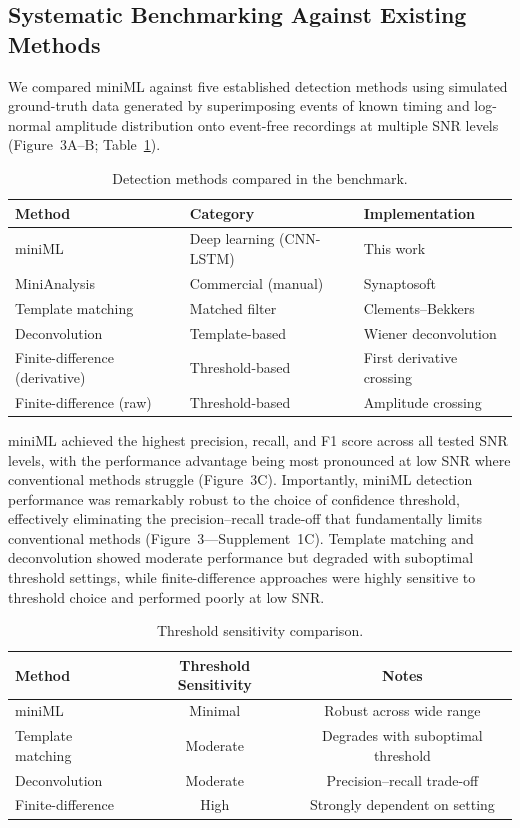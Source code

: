 \documentclass[11pt]{article}
\begin{document}
\subsection{Systematic Benchmarking Against Existing Methods}

We compared miniML against five established detection methods using simulated ground-truth data generated by superimposing events of known timing and log-normal amplitude distribution onto event-free recordings at multiple SNR levels (Figure~3A--B; Table~\ref{tab:methods}).

\begin{table}[H]
\centering
\caption{Detection methods compared in the benchmark.}
\label{tab:methods}
\begin{tabular}{lll}
\toprule
Method & Category & Implementation \\
\midrule
miniML & Deep learning (CNN-LSTM) & This work \\
MiniAnalysis & Commercial (manual) & Synaptosoft \\
Template matching & Matched filter & Clements--Bekkers \\
Deconvolution & Template-based & Wiener deconvolution \\
Finite-difference (derivative) & Threshold-based & First derivative crossing \\
Finite-difference (raw) & Threshold-based & Amplitude crossing \\
\bottomrule
\end{tabular}
\end{table}

miniML achieved the highest precision, recall, and F1 score across all tested SNR levels, with the performance advantage being most pronounced at low SNR where conventional methods struggle (Figure~3C). Importantly, miniML detection performance was remarkably robust to the choice of confidence threshold, effectively eliminating the precision--recall trade-off that fundamentally limits conventional methods (Figure~3---Supplement~1C). Template matching and deconvolution showed moderate performance but degraded with suboptimal threshold settings, while finite-difference approaches were highly sensitive to threshold choice and performed poorly at low SNR.

\begin{table}[H]
\centering
\caption{Threshold sensitivity comparison.}
\label{tab:threshold}
\begin{tabular}{lcc}
\toprule
Method & Threshold Sensitivity & Notes \\
\midrule
miniML & Minimal & Robust across wide range \\
Template matching & Moderate & Degrades with suboptimal threshold \\
Deconvolution & Moderate & Precision--recall trade-off \\
Finite-difference & High & Strongly dependent on setting \\
\bottomrule
\end{tabular}
\end{table}
\end{document}
